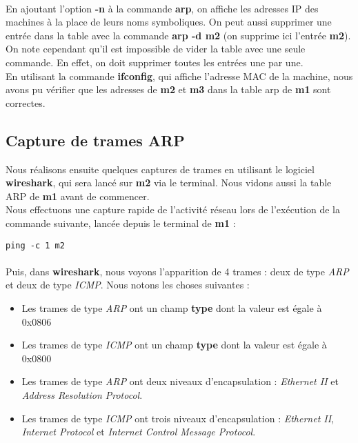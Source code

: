 \documentclass{article}
\begin{document}
\paragraph{}{
En ajoutant l'option \textbf{-n} à la commande \textbf{arp}, on affiche les adresses IP des machines à la place de leurs noms symboliques. On peut aussi supprimer une entrée dans la table avec la commande \textbf{arp -d m2} (on supprime ici l'entrée \textbf{m2}). On note cependant qu'il est impossible de vider la table avec une seule commande. En effet, on doit supprimer toutes les entrées une par une.
} \\

En utilisant la commande \textbf{ifconfig}, qui affiche l'adresse MAC de la machine, nous avons pu vérifier que les adresses de \textbf{m2} et \textbf{m3} dans la table arp de \textbf{m1} sont correctes.

\subsection{Capture de trames ARP}

Nous réalisons ensuite quelques captures de trames en utilisant le logiciel \textbf{wireshark}, qui sera lancé sur \textbf{m2} via le terminal. Nous vidons aussi la table ARP de \textbf{m1} avant de commencer. \\

Nous effectuons une capture rapide de l'activité réseau lors de l'exécution de la commande suivante, lancée depuis le terminal de \textbf{m1} :
\begin{verbatim}
ping -c 1 m2
\end{verbatim}
\paragraph{}{
Puis, dans \textbf{wireshark}, nous voyons l'apparition de 4 trames : deux de type \textit{ARP} et deux de type \textit{ICMP}. Nous notons les choses suivantes :
\begin{itemize}
\item Les trames de type \textit{ARP} ont un champ \textbf{type} dont la valeur est égale à 0x0806
\item Les trames de type \textit{ICMP} ont un champ \textbf{type} dont la valeur est égale à 0x0800
\item Les trames de type \textit{ARP} ont deux niveaux d'encapsulation : \textit{Ethernet II} et \textit{Address Resolution Protocol}.
\item Les trames de type \textit{ICMP} ont trois niveaux d'encapsulation : \textit{Ethernet II}, \textit{Internet Protocol} et \textit{Internet Control Message Protocol}.
\end{itemize}}
\end{document}
